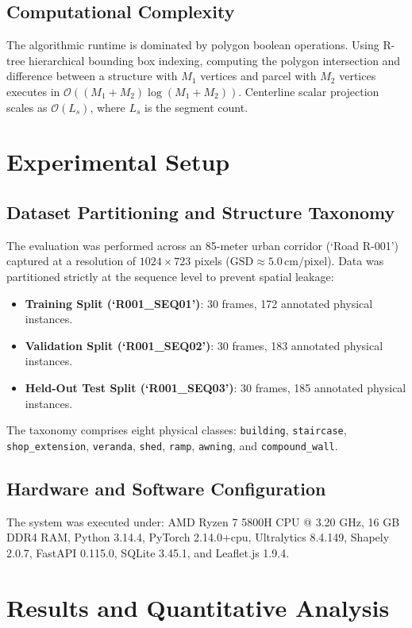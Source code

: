 \documentclass[conference]{IEEEtran}
\begin{document}
\subsection{Computational Complexity}
The algorithmic runtime is dominated by polygon boolean operations. Using R-tree hierarchical bounding box indexing, computing the polygon intersection and difference between a structure with $M_1$ vertices and parcel with $M_2$ vertices executes in $\mathcal{O}((M_1 + M_2) \log(M_1 + M_2))$. Centerline scalar projection scales as $\mathcal{O}(L_s)$, where $L_s$ is the segment count.

\section{Experimental Setup}

\subsection{Dataset Partitioning and Structure Taxonomy}
The evaluation was performed across an 85-meter urban corridor (`Road R-001') captured at a resolution of $1024 \times 723$ pixels ($\text{GSD} \approx 5.0\,\text{cm/pixel}$). Data was partitioned strictly at the sequence level to prevent spatial leakage:
\begin{itemize}
    \item \textbf{Training Split (`R001\_SEQ01')}: 30 frames, 172 annotated physical instances.
    \item \textbf{Validation Split (`R001\_SEQ02')}: 30 frames, 183 annotated physical instances.
    \item \textbf{Held-Out Test Split (`R001\_SEQ03')}: 30 frames, 185 annotated physical instances.
\end{itemize}

The taxonomy comprises eight physical classes: \texttt{building}, \texttt{staircase}, \texttt{shop\_extension}, \texttt{veranda}, \texttt{shed}, \texttt{ramp}, \texttt{awning}, and \texttt{compound\_wall}.

\subsection{Hardware and Software Configuration}
The system was executed under: AMD Ryzen 7 5800H CPU @ 3.20 GHz, 16 GB DDR4 RAM, Python 3.14.4, PyTorch 2.14.0+cpu, Ultralytics 8.4.149, Shapely 2.0.7, FastAPI 0.115.0, SQLite 3.45.1, and Leaflet.js 1.9.4.

\section{Results and Quantitative Analysis}
\end{document}
